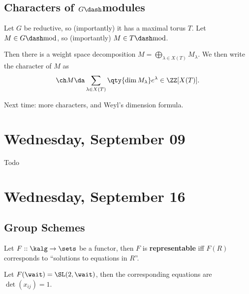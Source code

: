 \hypertarget{characters-of-gdashmodules}{%
\subsection{\texorpdfstring{Characters of
\(G\dash\)modules}{Characters of G\textbackslash dashmodules}}\label{characters-of-gdashmodules}}

Let \(G\) be reductive, so (importantly) it has a maximal torus \(T\).
Let \(M\in G\dash\mathrm{mod}\), so (importantly)
\(M\in T\dash\mathrm{mod}\).

Then there is a weight space decomposition
\(M = \bigoplus_{\lambda \in X(T)} M_\lambda\). We then write the
character of \(M\) as
\begin{align*}  
\ch M \da \sum_{\lambda \in X(T)} \qty{\dim M_\lambda} e^{\lambda} \in \ZZ[X(T)]
.\end{align*}

Next time: more characters, and Weyl's dimension formula.

\hypertarget{wednesday-september-09}{%
\section{Wednesday, September 09}\label{wednesday-september-09}}

Todo

\hypertarget{wednesday-september-16}{%
\section{Wednesday, September 16}\label{wednesday-september-16}}

\hypertarget{group-schemes}{%
\subsection{Group Schemes}\label{group-schemes}}

\begin{definition}

Let \(F:: \kalg \to \sets\) be a functor, then \(F\) is
\textbf{representable} iff \(F(R)\) corresponds to ``solutions to
equations in \(R\)''.

\end{definition}

\begin{example}

Let \(F(\wait) = \SL(2, \wait)\), then the corresponding equations are
\(\det (x_{ij}) = 1\).

\end{example}

